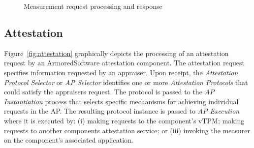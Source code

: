\documentclass[10pt]{article}
\begin{document}
\begin{figure}
\centering 
{}
  \caption{Measurement request processing and response}
  \label{fig:measurement}
\end{figure}

\subsection{Attestation}

Figure~\ref{fig:attestation} graphically depicts the processing of an
attestation request by an ArmoredSoftware attestation component.  The
attestation request specifies information requested by an appraiser.
Upon receipt, the \emph{Attestation Protocol Selector} or \emph{AP
  Selector} identifies one or more \emph{Attestation Protocols} that
could satisfy the appraisers request.  The protocol is passed to the
\emph{AP Instantiation} process that selects specific mechanisms for
achieving individual requests in the AP.  The resulting protocol
instance is passed to \emph{AP Execution} where it is executed by: (i)
making requests to the component's vTPM; making requests to another
components attestation service; or (iii) invoking the measurer on the
component's associated application.
\end{document}
